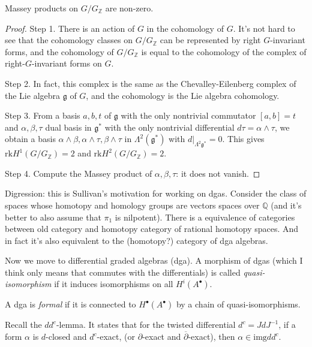 \begin{lemma}
\label{lemma-heise-nilma-masse-produ}
Massey products on  $G/G_{\mathbb{Z}}$ are
non-zero.
\end{lemma}

\begin{proof}
Step 1. There is an action of $G$ in the
cohomology of $G$.
It's not hard to see that the cohomology
classes on $G/G_{\mathbb{Z}}$
can be represented by right $G$-invariant
forms,
and the cohomology of $G/G_{\mathbb{Z}}$ is
equal to the cohomology of the complex
of right-$G$-invariant forms on $G$.

\medskip\noindent
Step 2. In fact, this complex is the same as
the
Chevalley-Eilenberg complex of the Lie
algebra $\mathfrak{g}$ of $G$,
and the cohomology is the Lie algebra
cohomology.

\medskip\noindent
Step 3. From a basis $a,b,t$ of
$\mathfrak{g}$ with the only nontrivial
commutator $[a,b]=t$ and $\alpha,\beta,\tau$
dual basis in $\mathfrak{g}^*$
with the only nontrivial differential
$d\tau=\alpha\wedge\tau$,
we obtain a basis $\alpha \wedge \beta,
\alpha \wedge \tau, \beta \wedge \tau$
in $\Lambda^2(\mathfrak{g}^*)$ with
$d|_{\Lambda^2\mathfrak{g}^*}=0$.
This gives $\text{rk}
H^1(G/G_{\mathbb{Z}})=2$
and $\text{rk}H^2(G/G_{\mathbb{Z}})=2$.

\medskip\noindent
Step 4. Compute the Massey product of
$\alpha,\beta,\tau$:
it does not vanish.
\end{proof}

\medskip\noindent
Digression: this is Sullivan's motivation for
working on dgas.
Consider the class of spaces whose homotopy
and homology
groups are vectors spaces over $\mathbb{Q}$
(and it's better to also assume that $\pi_1$
is nilpotent).
There is a equivalence of categories between
old category
and homotopy category of rational homotopy
spaces.
And in fact it's also equivalent to the
(homotopy?)
category of dga algebras.

\medskip\noindent
Now we move to differential graded algebras
(dga).
A morphism of dgas (which I think only means
that commutes with
the differentials) is called {\it
quasi-isomorphism} if it
induces isomorphisms on all $H^i(A^\bullet)$.

A dga is {\it formal} if it is connected to
$H^\bullet(A^\bullet)$
by a chain of quasi-isomorphisms.

Recall the $dd^c$-lemma. It states that for
the twisted
differential $d^c=Jd J^{-1}$, if a form
$\alpha$ is $d$-closed and $d^c$-exact,
(or $\partial$-exact and
$\overline{\partial}$-exact),
then $\alpha\in \text{img}dd^c$.

